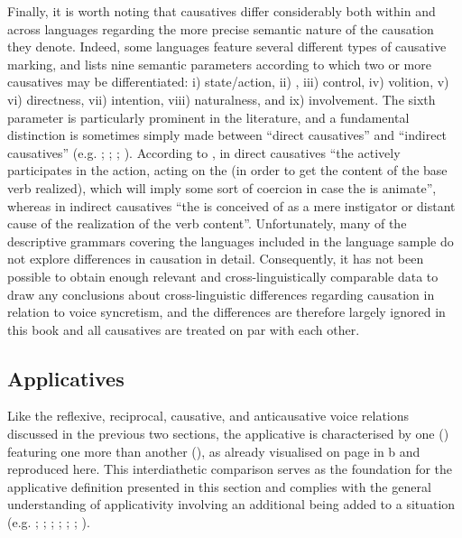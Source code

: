 Finally, it is worth noting that causatives differ considerably both within and across languages regarding the more precise semantic nature of the causation they denote. Indeed, some languages feature several different types of causative marking, and \cite[62]{dixon:2000} lists nine semantic parameters according to which two or more causatives may be differentiated: i) state/action, ii) , iii) control, iv) volition, v)  vi) directness, vii) intention, viii) naturalness, and ix) involvement. The sixth parameter is particularly prominent in the literature, and a fundamental distinction is sometimes simply made between “direct causatives” and “indirect causatives” (e.g. \citealt[171]{comrie:1989}; \citealt[892]{kulikov:2001}; \citealt{shibatani:pardeshi:2002}; \citealt[34ff.]{zuniga:kittila:2019}). According to \cite[1138]{haspelmath:muller-bardey:2004}, in direct causatives “the  actively participates in the action, acting on the  (in order to get the content of the base verb realized), which will imply some sort of coercion in case the  is animate”, whereas in indirect causatives “the  is conceived of as a mere instigator or distant cause of the realization of the verb content”. Unfortunately, many of the descriptive grammars covering the languages included in the language sample do not explore differences in causation in detail. Consequently, it has not been possible to obtain enough relevant and cross-linguistically comparable data to draw any conclusions about cross-linguistic differences regarding causation in relation to voice syncretism, and the differences are therefore largely ignored in this book and all causatives are treated on par with each other.

\subsection{Applicatives} \label{def:applicatives}
Like the reflexive, reciprocal, causative, and anticausative voice relations discussed in the previous two sections, the applicative  is characterised by one  () featuring one  more than another  (), as already visualised on page \pageref{fig:ch2:diathetic-relations} in b and reproduced here. This interdiathetic comparison serves as the foundation for the applicative definition presented in this section and complies with the general understanding of applicativity involving an additional  being added to a situation (e.g. \citealt[144f.]{kazenin:1994}; \citealt[31]{dixon:2000}; \citealt[13f.]{dixon:aikhenvald:2000}; \citealt[389]{kulikov:2010}; \citealt[90, 96]{malchukov:2015}; \citeyear[413]{malchukov:2016}; \citealt[47]{zuniga:kittila:2019}).

